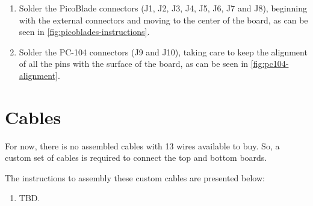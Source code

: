 \begin{enumerate}
    \item Solder the PicoBlade connectors (J1, J2, J3, J4, J5, J6, J7 and J8), beginning with the external connectors and moving to the center of the board, as can be seen in \autoref{fig:picoblades-instructions}.
    \item Solder the PC-104 connectors (J9 and J10), taking care to keep the alignment of all the pins with the surface of the board, as can be seen in \autoref{fig:pc104-alignment}.
\end{enumerate}

\section{Cables}

For now, there is no assembled cables with 13 wires available to buy. So, a custom set of cables is required to connect the top and bottom boards.

The instructions to assembly these custom cables are presented below:

\begin{enumerate}
    \item TBD.
\end{enumerate}
